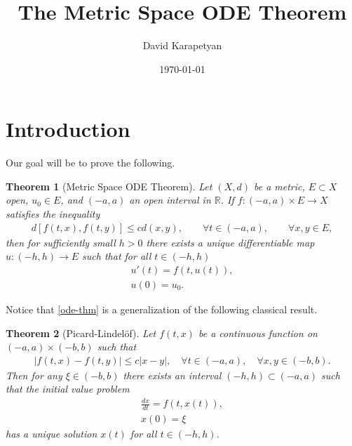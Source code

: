 \documentclass[12pt,reqno]{amsart}
\numberwithin{equation}{section}  %
\numberwithin{figure}{section}
\newcommand{\rr}{\mathbb{R}}
\theoremstyle{plain}
\newtheorem{theorem}{Theorem}
\theoremstyle{definition}
\theoremstyle{remark}
\begin{document}
\title{The Metric Space ODE Theorem}
\author{David Karapetyan}
\address{Department of Mathematics  \\
	University  of Notre Dame\\
		Notre Dame, IN 46556 }
		\date{\today}
		\maketitle
%
%
\section{Introduction}
%
%
%
%
%
%
%
%
%
%
%


Our goal will be to prove the following.
%
%
%
%
%
%
%
%
\begin{theorem}[Metric Space ODE Theorem]
	\label{ode-thm}
  Let $(X,d)$ be a metric, $E \subset X$ open, $u_0 \in E$, and $(-a, a)$ an
	open interval in $\rr$. If $f: (-a, a) \times E \to X$ satisfies the
	inequality
	\begin{equation}
		\label{stronger-ode}
		\begin{split}
      d[f(t, x), f(t, y)] \le c d(x, y), \qquad \forall t \in (-a, a),
			\qquad \forall x, y \in E,
		\end{split}
	\end{equation}
  then for sufficiently small $h > 0$ there exists a unique
	differentiable map $u: (-h, h) \to E$ such that for all $t \in (-h, h)$
	\begin{gather}
    \label{ode-thm-eq}
			u'(t) = f(t, u(t)),
			\\
      \label{ode-thm-init-data}
			u(0) = u_0.
	\end{gather}
\end{theorem}
%
%
Notice that \autoref{ode-thm} is a 
generalization of the following classical result.
%
%
%
%
%
%
%
%
\begin{theorem}[Picard-Lindel\"{o}f]
	Let $f(t, x)$ be a continuous function on $(- a, a) \times (- b,
	b)$ such that
	\begin{equation*}
		\begin{split}
			| f(t, x) - f(t, y) | \le c| x - y |, \quad \forall t \in (-a, a),
			\quad \forall x,y \in (- b, b).
		\end{split}
	\end{equation*}
	Then for any $\xi \in (-b, b)$ there exists an interval $(-h, h)
	\subset (-a, a)$ such that the initial value problem
	\begin{gather}
			\frac{dx}{dt} = f(t, x(t)),
			\\
			x(0) = \xi 
	\end{gather}
	has a unique solution $x(t)$ for all $t \in (-h, h)$.
	\end{theorem}
\end{document}
